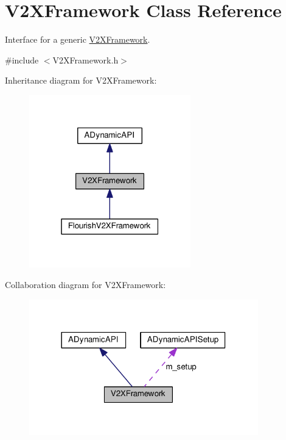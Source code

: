 \hypertarget{classV2XFramework}{}\section{V2\+X\+Framework Class Reference}
\label{classV2XFramework}


Interface for a generic \hyperlink{classV2XFramework}{V2\+X\+Framework}.  




{\ttfamily \#include $<$V2\+X\+Framework.\+h$>$}



Inheritance diagram for V2\+X\+Framework\+:\nopagebreak
\begin{figure}[H]
\begin{center}
\leavevmode
\includegraphics[width=199pt]{classV2XFramework__inherit__graph}
\end{center}
\end{figure}


Collaboration diagram for V2\+X\+Framework\+:\nopagebreak
\begin{figure}[H]
\begin{center}
\leavevmode
\includegraphics[width=282pt]{classV2XFramework__coll__graph}
\end{center}
\end{figure}
